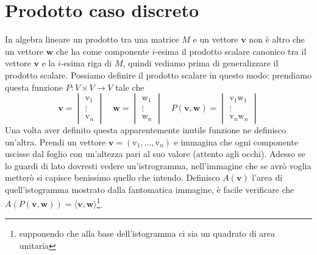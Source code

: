 \documentclass[11pt,a4paper]{report}
\newcommand{\vettore}[1]{\mathbf{#1}}
\newcommand{\vettorec}[1]{\textrm{#1}}
\newcommand{\pscal}[2]{\langle \vettore{#1},\vettore{#2}\rangle}
\theoremstyle{definition}
\theoremstyle{plain}
\theoremstyle{plain}
\begin{document}
		\section{Prodotto caso discreto}
		\label{sec:prod-can}
			In algebra lineare un prodotto tra una matrice $M$ e un vettore $\vettore v$ non è altro che un vettore $\vettore w$ che ha come componente $i$-esima il prodotto scalare canonico tra il vettore $\vettore v$ e la $i$-esima riga di $M$, quindi vediamo prima di generalizzare il prodotto scalare.\newline
			Possiamo definire il prodotto scalare in questo modo: prendiamo questa funzione $P:V\times V\rightarrow V$ tale che 
			\begin{equation}
				\vettore v=
				\begin{vmatrix}
					\vettorec v_1\\
					\vdots \\
					\vettorec v_n
				\end{vmatrix}
				\quad \vettore w=
				\begin{vmatrix}
					\vettorec w_1\\
					\vdots \\
					\vettorec w_n
				\end{vmatrix}
				\quad P(\vettore v,\vettore w)=
				\begin{vmatrix}
					\vettorec v_1 \vettorec w_1\\
					\vdots \\
					\vettorec v_n \vettorec  w_n
				\end{vmatrix}
			\end{equation}
			Una volta aver definito questa apparentemente inutile funzione ne definisco un'altra. Prendi un vettore $\vettore v=(\vettorec v_1,\dots,\vettorec v_n)$ e immagina che ogni componente uscisse dal foglio con un'altezza pari al suo valore (attento agli occhi).\newline
			Adesso se lo guardi di lato dovresti vedere un'istrogramma, nell'immagine che se avrò voglia metterò si capisce benissimo quello che intendo.\newline
			Definisco $A(\vettore v)$ l'area di quell'istogramma mostrato dalla fantomatica immagine, è facile verificare che $A(P(\vettore v,\vettore w))=\pscal{v}{w}$\footnote{supponendo che alla base dell'istogramma ci sia un quadrato di area unitaria}.
\end{document}
